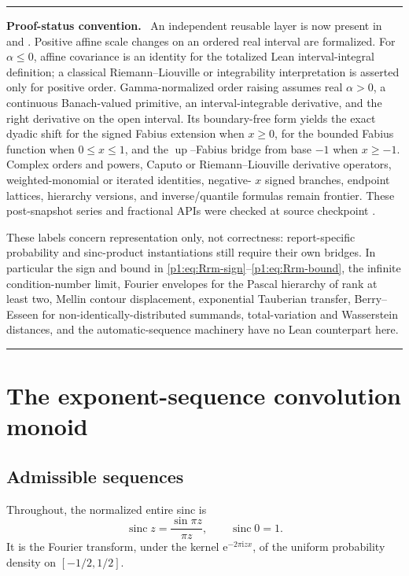 \documentclass[11pt,oneside]{article}
\numberwithin{equation}{section}
\theoremstyle{definition}
\theoremstyle{remark}
\newcommand{\Up}{\operatorname{up}}
\newcommand{\sinc}{\operatorname{sinc}}
\newcommand{\e}{\mathrm e}
\newcommand{\ii}{\mathrm i}
\newenvironment{statusbox}[1]{%
  \par\medskip\noindent\begin{center}\begin{minipage}{0.94\textwidth}%
  \color{linkblue}\hrule\vspace{0.65em}%
  \color{black}\textbf{\color{linkblue}#1.}\ }{%
  \par\vspace{0.65em}\color{linkblue}\hrule
  \end{minipage}\end{center}\medskip}
\begin{document}
\begin{statusbox}{Proof-status convention}
An independent reusable layer is now present in
 and
.  Positive affine scale changes on an ordered
real interval are formalized.  For $\alpha\le0$, affine covariance is an identity for
the totalized Lean interval-integral definition; a classical Riemann--Liouville or
integrability interpretation is asserted only for positive order.  Gamma-normalized
order raising assumes real $\alpha>0$, a
continuous Banach-valued primitive, an interval-integrable derivative, and the
right derivative  on the open interval.  Its boundary-free
form yields the exact dyadic shift for the signed Fabius extension when $x\ge0$,
for the bounded Fabius function when $0\le x\le1$, and the $\Up$--Fabius bridge
from base $-1$ when $x\ge-1$.  Complex orders and powers, Caputo or
Riemann--Liouville derivative operators, weighted-monomial or iterated identities, negative-
$x$ signed branches, endpoint lattices, hierarchy versions, and inverse/quantile
formulas remain frontier.  These post-snapshot series and fractional APIs were
checked at source checkpoint
.

These labels concern representation only, not correctness: report-specific
probability and sinc-product instantiations still require their own bridges.  In
particular the sign and bound in \eqref{p1:eq:Rrm-sign}--\eqref{p1:eq:Rrm-bound},
the infinite condition-number limit, Fourier envelopes for the Pascal hierarchy
of rank at least two, Mellin contour displacement, exponential Tauberian transfer,
Berry--Esseen for non-identically-distributed summands, total-variation and
Wasserstein distances, and the automatic-sequence machinery have no Lean
counterpart here.
\end{statusbox}

\section{The exponent-sequence convolution monoid}
\label{p1:sec:master}

\subsection{Admissible sequences}

Throughout, the normalized entire sinc is
\begin{equation}
 \sinc z=\frac{\sin\pi z}{\pi z},\qquad \sinc0=1.
 \label{p1:eq:sinc-normalized}
\end{equation}
It is the Fourier transform, under the kernel $\e^{-2\pi\ii zx}$, of the uniform
probability density on $[-1/2,1/2]$.
\end{document}
